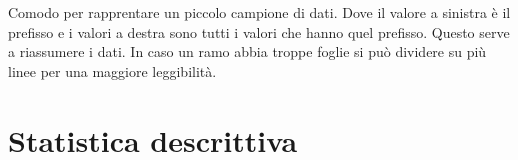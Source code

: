 \documentclass{article}
\begin{document}
  \begin{minipage}[c]{0.30\textwidth}
      \centering
      \vspace{-2mm}
  \end{minipage}
  \hspace{2mm}
  \begin{minipage}[c]{0.6\textwidth}
    Comodo per rapprentare un piccolo campione di dati. Dove il valore a sinistra è il prefisso e i valori a destra sono tutti i valori che hanno quel prefisso. Questo serve a riassumere i dati. In caso un ramo abbia troppe foglie si può dividere su più linee per una maggiore leggibilità.
      \vspace{-3mm}
  \end{minipage}
  \vspace{1mm}
  
\section{Statistica descrittiva}
\end{document}
